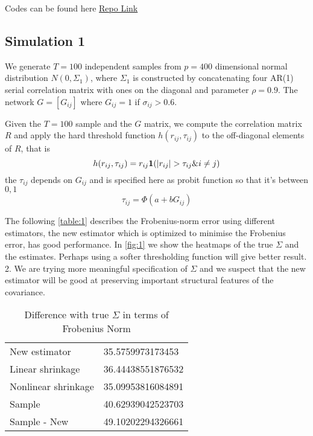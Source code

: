 Codes can be found here \href{https://github.com/lwg342/Covariance-Estimation-with-Auxiliary-Information}{Repo Link}
    \subsection{Simulation 1}
        We generate \(T = 100\) independent samples from \(p = 400\) dimensional normal distribution \(N(0, \Sigma_{1})\), where \(\Sigma_{1}\) is constructed by concatenating four AR(1) serial correlation matrix with ones on the diagonal and parameter \(\rho = 0.9\). The network \(G = [G_{ij}]\) where \(G_{ij} = 1\) if \(\sigma_{ij} > 0.6\). 
        
        Given the \(T = 100\) sample and the \(G\) matrix, we compute the correlation matrix \(R\) and apply the hard threshold function \(h(r_{ij}, \tau_{ij})\) to the off-diagonal elements of \(R\), that is 
        \begin{equation*}
            h(r_{ij}, \tau_{ij}) = r_{ij} \mathbf{1}\pqty{\abs{r_{ij}} > \tau_{ij} \& i \neq j}
        \end{equation*}
        the \(\tau_{ij}\) depends on \(G_{ij}\) and is specified here as probit function so that it's between \(0, 1\)
        \begin{equation*}
            \tau_{ij} = \Phi(a + b G_{ij})
        \end{equation*}
        
        The following \autoref{table:1} describes the Frobenius-norm error using different estimators, the new estimator which is optimized to minimise the Frobenius error, has good performance. 
         In \autoref{fig:1} we show the heatmaps of the true \(\Sigma\) and the estimates. Perhaps using a softer thresholding function will give better result. 2. We are trying more meaningful specification of \(\Sigma\) and we suspect that the new estimator will be good at preserving  important structural features of the covariance.
        
        \begin{table}[htbp]
            \centering
            \begin{tabular}{ll}
            New estimator               & 35.5759973173453  \\
            Linear shrinkage    & 36.44438551876532 \\
            Nonlinear shrinkage & 35.09953816084891 \\
            Sample              & 40.62939042523703 \\
            Sample - New        & 49.10202294326661
            \end{tabular}
            \caption{Difference with true \(\Sigma\) in terms of Frobenius Norm}
            \label{table:1}
        \end{table}
   
